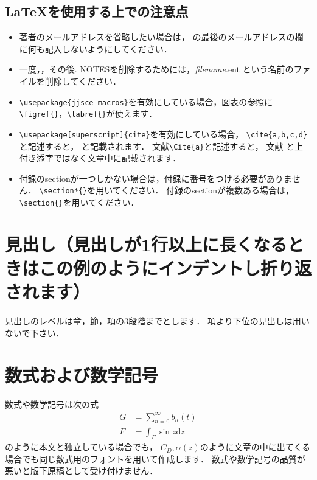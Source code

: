 \documentclass{jjsce}
\begin{document}
\subsection{LaTeXを使用する上での注意点}
\begin{itemize}
 \item 著者のメールアドレスを省略したい場合は，
\verb@\affiliate@ の最後のメールアドレスの欄に何も記入しないようにしてください．

 \item 一度，\verb@{}，その後\verb@{}.
NOTESを削除するためには，\textit{filename}.ent という名前のファイルを削除してください．

 \item \verb|\usepackage{jjsce-macros}|を有効にしている場合，図表の参照に
\verb|\figref{}|，\verb|\tabref{}|が使えます．

 \item \verb|\usepackage[superscript]{cite}|を有効にしている場合，
\verb|\cite{a,b,c,d}|と記述すると，
\cite{a,b,c,d} と記載されます．
文献\verb|\Cite{a}|と記述すると，
文献\Cite{a} と上付き添字ではなく文章中に記載されます．

 \item 
付録のsectionが一つしかない場合は，付録に番号をつける必要がありません．
\verb|\section*{}|を用いてください．
付録のsectionが複数ある場合は，
\verb|\section{}|を用いてください．

\end{itemize}



\section{見出し（見出しが1行以上に長くなるときはこの例のようにインデントし折り返されます）}
見出しのレベルは章，節，項の3段階までとします．
項より下位の見出しは用いないで下さい．

\section{数式および数学記号}
数式や数学記号は次の式
\begin{align}
G&=\sum_{n=0}^\infty b_n(t)\\
F&=\int_{\Gamma}\sin z \mathrm{d}z
\end{align}
のように本文と独立している場合でも，
$C_D, \alpha(z)$のように文章の中に出てくる場合でも同じ数式用のフォントを用いて作成します．
数式や数学記号の品質が悪いと版下原稿として受け付けません．
\end{document}
